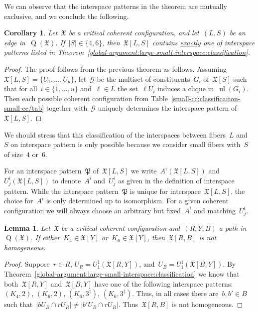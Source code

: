 \documentclass[english,a4paper]{article}
\theoremstyle{plain}
\newtheorem{lemma}      [theorem]{Lemma}
\newtheorem{corollary}  [theorem]{Corollary}
\theoremstyle{definition}
\newcommand{\abs}[1]{| #1 |}
\newcommand{\coherentConfig}{\ensuremath{\mathfrak{X}}}
\newcommand{\interspace}[2]{\ensuremath{\coherentConfig[#1,#2]}}
\newcommand{\inducedCC}[1]{\ensuremath{\coherentConfig[#1]}}
\DeclareMathOperator*{\ul}{ul}
\DeclareMathOperator*{\Quotient}{Q}
\newcommand{\quotientGraph}[1]{\ensuremath{\Quotient(#1)}}
\newcommand{\ipfourClique}  {\ensuremath{(\clique{4},2)}}
\newcommand{\ipsixCliqueTwo}     {\ensuremath{(\clique{6},2)}}
\newcommand{\ipsixCliqueThree}   {\ensuremath{(\clique{6},3^\dag)}}
\newcommand{\ipsixCliqueThreeD}	 {\ensuremath{(\clique{6},3^\ddag)}}
\newcommand{\clique}[1]{\ensuremath{K_{#1}}}
\begin{document}
We can observe that the interspace patterns in the theorem are mutually exclusive, and we conclude the following.


\begin{corollary}
\label{large-small-interspace:classification:uniqueness/cor}
    Let~$\coherentConfig$ be a critical coherent configuration, and let~$(L,S)$ be an edge in~$\quotientGraph{\coherentConfig}$.
    If~$\abs{S} \in \{4,6\}$, then~$\interspace{L}{S}$ contains \underline{exactly} one of interspace patterns listed in Theorem~\ref{global-argument:large-small-interspace:classification}.
\end{corollary}
\begin{proof}
    The proof follows from the previous theorem as follows.
    Assuming~$\interspace{L}{S} = \{U_1,\ldots,U_u\}$, let~$\mathcal{G}$ be the multiset of constituents~$G_i$ of~$\inducedCC{S}$ such that for all~$i \in \{1,\ldots,u\}$ and~$\ell \in L$ the set~$\ell U_i$ induces a clique in~$\ul(G_i)$.
    Then each possible coherent configuration from Table~\ref{small-cc:classificaiton-small-cc/tab} together with~$\mathcal{G}$ uniquely determines the interspace pattern of~$\interspace{L}{S}$.

\end{proof}

We should stress that this classification of the interspaces between fibers~$L$ and~$S$ on interspace pattern is only possible because we consider small fibers with~$S$ of size~$4$ or~$6$.


For an interspace pattern~$\mathfrak{P}$ of~$\interspace{L}{S}$ we write~$A^i(\interspace{L}{S})$ and~$U^i_j(\interspace{L}{S})$ to denote~$A^i$ and~$U^i_j$ as given in the definition of interspace pattern. While the interspace pattern~$\mathfrak{P}$ is unique for interspace~$\interspace{L}{S}$, the choice for~$A^i$ is only determined up to isomorphism. For a given coherent configuration we will always choose an arbitrary but fixed~$A^i$ and matching~$U^i_j$.


\begin{lemma}
\label{global-argument:k4-exclusion/lem}
    Let~$\coherentConfig$ be a critical coherent configuration and~$(R,Y,B)$ a path in~$\quotientGraph{\coherentConfig}$.
    If either~$\clique{4} \in \inducedCC{Y}$ or~$\clique{6} \in \inducedCC{Y}$, then~$\interspace{R}{B}$ is not homogeneous.
\end{lemma}
\begin{proof}
    Suppose~$r \in R$, $U_R = U^1_1(\interspace{R}{Y})$, and~$U_B = U^1_1(\interspace{B}{Y})$.
    By Theorem~\ref{global-argument:large-small-interspace:classification} we know that both~$\interspace{R}{Y}$ and~$\interspace{B}{Y}$ have one of the following interspace patterns:~$\ipfourClique$, $\ipsixCliqueTwo$, $\ipsixCliqueThree$, $\ipsixCliqueThreeD$. Thus, in all cases there are~$b, b' \in B$ such that~$|b U_B \cap r U_R|\neq |b' U_B \cap r U_R|$. Thus~$\interspace{R}{B}$ is not homogeneous.
\end{proof}
\end{document}
